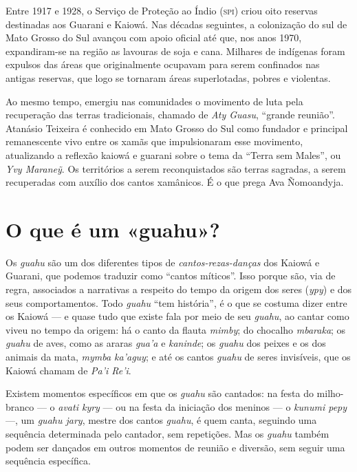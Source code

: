 Entre 1917 e 1928, o Serviço de Proteção ao Índio (\textsc{spi}) criou oito
reservas destinadas aos Guarani e Kaiowá. Nas décadas seguintes, a
colonização do sul de Mato Grosso do Sul avançou com apoio oficial até
que, nos anos 1970, expandiram-se na região as lavouras de soja e cana.
Milhares de indígenas foram expulsos das áreas que originalmente ocupavam
para serem confinados nas antigas reservas, que logo se tornaram áreas
superlotadas, pobres e violentas.

Ao mesmo tempo, emergiu nas comunidades o movimento de luta pela
recuperação das terras tradicionais, chamado de \textit{Aty Guasu}, ``grande
reunião''. Atanásio Teixeira é conhecido em Mato Grosso do Sul como
fundador e principal remanescente vivo entre os xamãs que impulsionaram
esse movimento, atualizando a reflexão kaiowá e guarani sobre o tema da
``Terra sem Males'', ou \textit{Yvy Maraneỹ}. Os territórios a serem
reconquistados são terras sagradas, a serem recuperadas com auxílio dos
cantos xamânicos. É o que prega Ava Ñomoandyja.

\section{O que é um «guahu»?}

Os \textit{guahu} são um dos diferentes tipos de \textit{cantos-rezas-danças} dos
Kaiowá e Guarani, que podemos traduzir como ``cantos míticos''. Isso porque são, via de regra, associados a
narrativas a respeito do tempo da origem dos seres (\textit{ypy}) e dos
seus comportamentos. Todo \textit{guahu} ``tem história'', é o que se
costuma dizer entre os Kaiowá --- e quase tudo que existe fala por meio de
seu \textit{guahu}, ao cantar como viveu no tempo da origem: há o canto da
flauta \textit{mimby}; do chocalho \textit{mbaraka}; os \textit{guahu} de
aves, como as araras \textit{gua'a} e \textit{kaninde}; os \textit{guahu} dos
peixes e os dos animais da mata, \textit{mymba ka'aguy}; e até os cantos
\textit{guahu} de seres invisíveis, que os Kaiowá chamam de \textit{Pa'i
Re'i}.

Existem momentos específicos em que os \textit{guahu} são cantados: na
festa do milho-branco --- o \textit{avati kyry} --- ou na festa da iniciação
dos meninos --- o \textit{kunumi pepy} ---, um \textit{guahu jary}, mestre dos
cantos \textit{guahu}, é quem canta, seguindo uma sequência determinada
pelo cantador, sem repetições. Mas os \textit{guahu} também podem ser
dançados em outros momentos de reunião e diversão, sem seguir uma
sequência específica.

